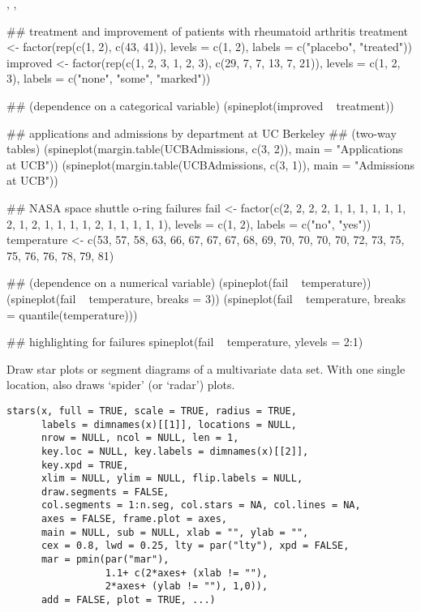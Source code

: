 %
\begin{SeeAlso}\relax
{}, , 
\end{SeeAlso}
%
\begin{Examples}
\begin{ExampleCode}
## treatment and improvement of patients with rheumatoid arthritis
treatment <- factor(rep(c(1, 2), c(43, 41)), levels = c(1, 2),
                    labels = c("placebo", "treated"))
improved <- factor(rep(c(1, 2, 3, 1, 2, 3), c(29, 7, 7, 13, 7, 21)),
                   levels = c(1, 2, 3),
                   labels = c("none", "some", "marked"))

## (dependence on a categorical variable)
(spineplot(improved ~ treatment))

## applications and admissions by department at UC Berkeley
## (two-way tables)
(spineplot(margin.table(UCBAdmissions, c(3, 2)),
           main = "Applications at UCB"))
(spineplot(margin.table(UCBAdmissions, c(3, 1)),
           main = "Admissions at UCB"))

## NASA space shuttle o-ring failures
fail <- factor(c(2, 2, 2, 2, 1, 1, 1, 1, 1, 1, 2, 1, 2, 1,
                 1, 1, 1, 2, 1, 1, 1, 1, 1),
               levels = c(1, 2), labels = c("no", "yes"))
temperature <- c(53, 57, 58, 63, 66, 67, 67, 67, 68, 69, 70, 70,
                 70, 70, 72, 73, 75, 75, 76, 76, 78, 79, 81)

## (dependence on a numerical variable)
(spineplot(fail ~ temperature))
(spineplot(fail ~ temperature, breaks = 3))
(spineplot(fail ~ temperature, breaks = quantile(temperature)))

## highlighting for failures
spineplot(fail ~ temperature, ylevels = 2:1)
\end{ExampleCode}
\end{Examples}
%
\begin{Description}\relax
Draw star plots or segment diagrams of a multivariate data set.
With one single location, also draws `spider'
(or `radar') plots.
\end{Description}
%
\begin{Usage}
\begin{verbatim}
stars(x, full = TRUE, scale = TRUE, radius = TRUE,
      labels = dimnames(x)[[1]], locations = NULL,
      nrow = NULL, ncol = NULL, len = 1,
      key.loc = NULL, key.labels = dimnames(x)[[2]],
      key.xpd = TRUE,
      xlim = NULL, ylim = NULL, flip.labels = NULL,
      draw.segments = FALSE,
      col.segments = 1:n.seg, col.stars = NA, col.lines = NA,
      axes = FALSE, frame.plot = axes,
      main = NULL, sub = NULL, xlab = "", ylab = "",
      cex = 0.8, lwd = 0.25, lty = par("lty"), xpd = FALSE,
      mar = pmin(par("mar"),
                 1.1+ c(2*axes+ (xlab != ""),
                 2*axes+ (ylab != ""), 1,0)),
      add = FALSE, plot = TRUE, ...)
\end{verbatim}
\end{Usage}
